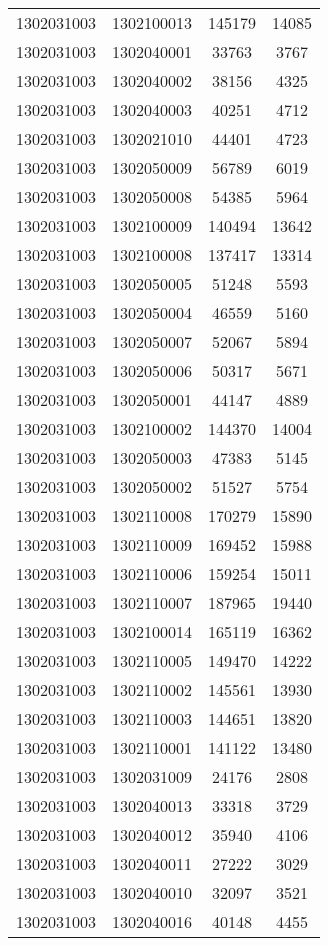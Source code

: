 \begin{longtable}[h]{llcc}
		1302031003 & 1302100013 & 145179 & 14085\\
		1302031003 & 1302040001 & 33763 & 3767\\
		1302031003 & 1302040002 & 38156 & 4325\\
		1302031003 & 1302040003 & 40251 & 4712\\
		1302031003 & 1302021010 & 44401 & 4723\\
		1302031003 & 1302050009 & 56789 & 6019\\
		1302031003 & 1302050008 & 54385 & 5964\\
		1302031003 & 1302100009 & 140494 & 13642\\
		1302031003 & 1302100008 & 137417 & 13314\\
		1302031003 & 1302050005 & 51248 & 5593\\
		1302031003 & 1302050004 & 46559 & 5160\\
		1302031003 & 1302050007 & 52067 & 5894\\
		1302031003 & 1302050006 & 50317 & 5671\\
		1302031003 & 1302050001 & 44147 & 4889\\
		1302031003 & 1302100002 & 144370 & 14004\\
		1302031003 & 1302050003 & 47383 & 5145\\
		1302031003 & 1302050002 & 51527 & 5754\\
		1302031003 & 1302110008 & 170279 & 15890\\
		1302031003 & 1302110009 & 169452 & 15988\\
		1302031003 & 1302110006 & 159254 & 15011\\
		1302031003 & 1302110007 & 187965 & 19440\\
		1302031003 & 1302100014 & 165119 & 16362\\
		1302031003 & 1302110005 & 149470 & 14222\\
		1302031003 & 1302110002 & 145561 & 13930\\
		1302031003 & 1302110003 & 144651 & 13820\\
		1302031003 & 1302110001 & 141122 & 13480\\
		1302031003 & 1302031009 & 24176 & 2808\\
		1302031003 & 1302040013 & 33318 & 3729\\
		1302031003 & 1302040012 & 35940 & 4106\\
		1302031003 & 1302040011 & 27222 & 3029\\
		1302031003 & 1302040010 & 32097 & 3521\\
		1302031003 & 1302040016 & 40148 & 4455\\

\end{longtable}
